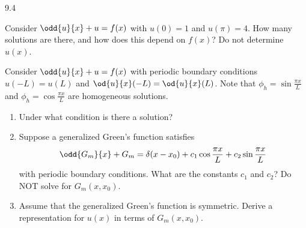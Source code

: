 \begin{exercises}{9.4}
\item Consider $\odd{u}{x} + u = f(x)$ with $u(0) = 1$ and $u(\pi) = 4$.  How many solutions are there, and how does this depend on $f(x)$?  Do not determine $u(x)$.

\item Consider $\odd{u}{x} + u = f(x)$ with periodic boundary conditions $u(-L) = u(L)$ and $\od{u}{x}(-L) = \od{u}{x}(L)$.  Note that $\phi_h = \sin\frac{\pi x}{L}$ and $\phi_h = \cos\frac{\pi x}{L}$ are homogeneous solutions.
\begin{enumerate}
\item[(a)] Under what condition is there a solution?
\item[(b)] Suppose a generalized Green's function satisfies
\[
\odd{G_m}{x} + G_m = \delta(x-x_0) + c_1\cos\frac{\pi x}{L} + c_2\sin\frac{\pi x}{L}
\]
with periodic boundary conditions.  What are the constants $c_1$ and $c_2$?  Do NOT solve for $G_m(x,x_0)$.
\item[(c)] Assume that the generalized Green's function is symmetric.  Derive a representation for $u(x)$ in terms of $G_m(x,x_0)$.
\end{enumerate}

\end{exercises}
